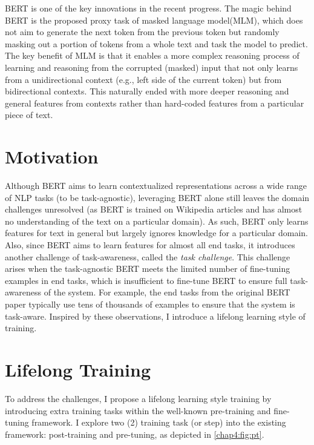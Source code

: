 BERT\cite{devlin2018bert} is one of the key innovations in the recent progress.
The magic behind BERT is the proposed proxy task of masked language model(MLM), which does not aim to generate the next token from the previous token but randomly masking out a portion of tokens from a whole text and task the model to predict.
The key benefit of MLM is that it enables a more complex reasoning process of learning and reasoning from the corrupted (masked) input that not only learns from a unidirectional context (e.g., left side of the current token) but from bidirectional contexts.
This naturally ended with more deeper reasoning and general features from contexts rather than hard-coded features from a particular piece of text.

\section{Motivation}
\label{chap4:sec:motivation}

Although BERT aims to learn contextualized representations across a wide range of NLP tasks (to be task-agnostic), leveraging BERT alone still leaves the domain challenges unresolved (as BERT is trained on Wikipedia articles and has almost no understanding of the text on a particular domain).
As such, BERT only learns features for text in general but largely ignores knowledge for a particular domain.
Also, since BERT aims to learn features for almost all end tasks, it introduces another challenge of task-awareness, called the \textit{task challenge}.
This challenge arises when the task-agnostic BERT meets the limited number of fine-tuning examples in end tasks, which is insufficient to fine-tune BERT to ensure full task-awareness of the system.
For example, the end tasks from the original BERT paper typically use tens of thousands of examples to ensure that the system is task-aware.
Inspired by these observations, I introduce a lifelong learning style of training.

\section{Lifelong Training}

To address the challenges, I propose a lifelong learning style training by introducing extra training tasks within the well-known pre-training and fine-tuning framework.
I explore two (2) training task (or step) into the existing framework: post-training and pre-tuning, as depicted in \ref{chap4:fig:pt}.

